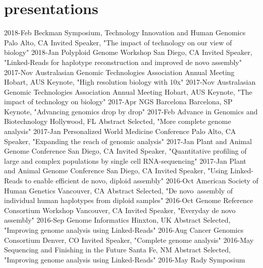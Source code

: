 \documentclass[]{dmc-cv} %
\begin{document}

\section{presentations}
\begin{entrylist}
\entry
{2018-Feb}
{Beckman Symposium, Technology Innovation and Human Genomics}
{Palo Alto, CA}
{Invited Speaker, "The impact of technology on our view of biology"}
\entry
{2018-Jan}
{Polyploid Genome Workshop}
{San Diego, CA}
{Invited Speaker, "Linked-Reads for haplotype reconstruction and improved de novo assembly"}
\entry
{2017-Nov}
{Australasian Genomic Technologies Association Annual Meeting}
{Hobart, AUS}
{Keynote, "High resolution biology with 10x"}
\entry
{2017-Nov}
{Australasian Genomic Technologies Association Annual Meeting}
{Hobart, AUS}
{Keynote, "The impact of technology on biology"}
\entry
{2017-Apr}
{NGS Barcelona}
{Barcelona, SP}
{Keynote, "Advancing genomics drop by drop"}
\entry
{2017-Feb}
{Advance in Genomics and Biotechnology}
{Hollywood, FL}
{Abstract Selected, "More complete genome analysis"}
\entry
{2017-Jan}
{Personalized World Medicine Conference}
{Palo Alto, CA}
{Speaker, "Expanding the reach of genomic analysis"}
\entry
{2017-Jan}
{Plant and Animal Genome Conference}
{San Diego, CA}
{Invited Speaker, "Quantitative profiling of large and complex populations by single cell RNA-sequencing"}
\entry
{2017-Jan}
{Plant and Animal Genome Conference}
{San Diego, CA}
{Invited Speaker, "Using Linked-Reads to enable efficient de novo, diploid assembly"}
\entry
{2016-Oct}
{American Society of Human Genetics}
{Vancouver, CA}
{Abstract Selected, "De novo assembly of individual human haplotypes from diploid samples"}
\entry
{2016-Oct}
{Genome Reference Consortium Workshop}
{Vancouver, CA}
{Invited Speaker, "Everyday de novo assembly"}
\entry
{2016-Sep}
{Genome Informatics}
{Hinxton, UK}
{Abstract Selected, "Improving genome analysis using Linked-Reads"}
\entry
{2016-Aug}
{Cancer Genomics Consortium}
{Denver, CO}
{Invited Speaker, "Complete genome analysis"}
\entry
{2016-May}
{Sequencing and Finishing in the Future}
{Santa Fe, NM}
{Abstract Selected, "Improving genome analysis using Linked-Reads"}
\entry
{2016-May}
{Rady Symposium}

\end{entrylist}
\end{document}
